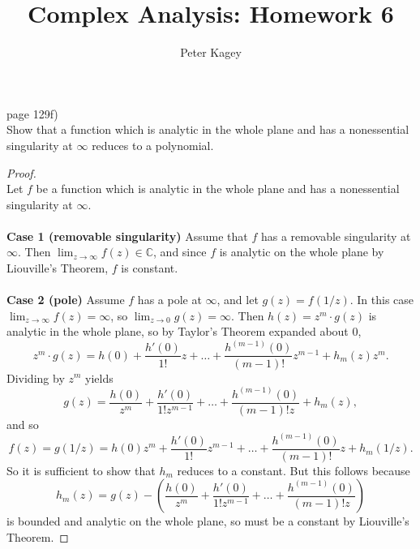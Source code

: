 \documentclass{article}
\newenvironment{problem}[2][Problem]{\begin{trivlist}
\item[\hskip \labelsep {\bfseries #1}\hskip \labelsep {\bfseries #2.}]}{\end{trivlist}}
\begin{document}
\title{Complex Analysis: Homework 6}
\author{Peter Kagey}

\maketitle

\begin{problem}{2} (page 129f) \\
  Show that a function which is analytic in the whole plane and has a
  nonessential singularity at $\infty$ reduces to a polynomial.
\end{problem}
\begin{proof} \text{} \\
  Let $f$ be a function which is analytic in the whole plane and has a
  nonessential singularity at $\infty$.
  \\~\\
  \textbf{Case 1 (removable singularity)} Assume that $f$ has a removable
    singularity at $\infty$. Then $\displaystyle\lim_{z\rightarrow\infty} f(z) \in \mathbb{C}$,
    and since $f$ is analytic on the whole plane by Liouville's Theorem, $f$ is
    constant.
  \\~\\
  \textbf{Case 2 (pole)} Assume $f$ has a pole at $\infty$, and let
    $g(z) = f(1/z)$. In this case $\lim_{z\rightarrow\infty} f(z) = \infty$,
    so $\lim_{z\rightarrow0} g(z) = \infty$. Then $h(z) = z^m\cdot g(z)$ is analytic
    in the whole plane, so by Taylor's Theorem expanded about $0$, \[
      z^m\cdot g(z) = h(0) + \frac{h'(0)}{1!}z + \hdots
      + \frac{h^{(m-1)}(0)}{(m-1)!}z^{m-1}
      + h_m(z)z^m.
    \] Dividing by $z^m$ yields \[
      g(z) = \frac{h(0)}{z^m} + \frac{h'(0)}{1!z^{m-1}} + \hdots
      + \frac{h^{(m-1)}(0)}{(m-1)!z}
      + h_m(z),
    \] and so \[
      f(z) = g(1/z) = h(0)z^m + \frac{h'(0)}{1!}z^{m-1} + \hdots
      + \frac{h^{(m-1)}(0)}{(m-1)!}z
      + h_m(1/z).
    \]
    So it is sufficient to show that $h_m$ reduces to a constant. But this
    follows because \[
      h_m(z) = g(z) - \left(\frac{h(0)}{z^m} + \frac{h'(0)}{1!z^{m-1}} + \hdots
        + \frac{h^{(m-1)}(0)}{(m-1)!z}\right)
    \] is bounded and analytic on the whole plane, so must be a constant by
    Liouville's Theorem.
\end{proof}
\pagebreak
\end{document}
